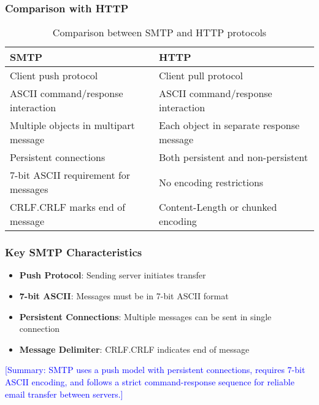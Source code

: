 \documentclass[12pt]{article}
\begin{document}
\subsubsection{Comparison with HTTP}
\begin{table}[h]
    \centering
    \begin{tabular}{p{6cm}p{6cm}}
        \toprule
        \textbf{SMTP}                         & \textbf{HTTP}                            \\
        \midrule
        Client push protocol                  & Client pull protocol                     \\
        ASCII command/response interaction    & ASCII command/response interaction       \\
        Multiple objects in multipart message & Each object in separate response message \\
        Persistent connections                & Both persistent and non-persistent       \\
        7-bit ASCII requirement for messages  & No encoding restrictions                 \\
        CRLF.CRLF marks end of message        & Content-Length or chunked encoding       \\
        \bottomrule
    \end{tabular}
    \caption{Comparison between SMTP and HTTP protocols}
\end{table}

\subsubsection{Key SMTP Characteristics}
\begin{itemize}
    \item \textbf{Push Protocol}: Sending server initiates transfer
    \item \textbf{7-bit ASCII}: Messages must be in 7-bit ASCII format
    \item \textbf{Persistent Connections}: Multiple messages can be sent in single connection
    \item \textbf{Message Delimiter}: CRLF.CRLF indicates end of message
\end{itemize}

\textcolor{blue}{[Summary: SMTP uses a push model with persistent connections, requires 7-bit ASCII encoding, and follows a strict command-response sequence for reliable email transfer between servers.]}
\end{document}
